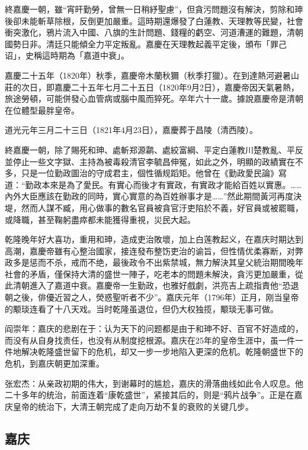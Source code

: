 終嘉慶一朝，雖“宵旰勤勞，曾無一日稍紓聖慮”，但貪污問題沒有解決，剪除和珅後卻未能斬草除根，反倒更加嚴重。這時期還爆發了白蓮教、天理教等民變，社會衝突激化，鴉片流入中國、八旗的生計問題、錢糧的虧空、河道漕運的難題，清朝國勢日非。清廷只能傾全力平定叛亂。嘉慶在天理教起義平定後，頒布「罪己诏」，史稱這時期為「嘉道中衰」。

嘉慶二十五年（1820年）秋季，嘉慶帝木蘭秋獮（秋季打獵）。在到達熱河避暑山莊的次日，即嘉慶二十五年七月二十五日（1820年9月2日），嘉慶帝因天氣暑熱，旅途勞頓，可能併發心血管病或腦中風而猝死。卒年六十一歲。據說嘉慶帝是清朝在位體型最胖皇帝。

道光元年三月二十三日（1821年4月23日），嘉慶葬于昌陵（清西陵）。

終嘉慶一朝，除了賜死和珅、處斬郑源鹴、處絞富綱、平定白蓮教川楚教亂、平反並停止一些文字獄、主持為被毒殺清官李毓昌伸冤，如此之外，明顯的政績實在不多，只是一位勤政圖治的守成君主，個性循规蹈矩。他曾在《勤政愛民論》寫道：“勤政本來是為了愛民。有實心而後才有實政，有實政才能給百姓以實惠。……內外大臣應該在勤政的同時，實心實意的為百姓辦事才是……”然此期間黃河再度決堤，然而人謀不臧，用心做事的數名官員被貪官汙吏陷於不義，好官員或被罷職，或降職，甚至鞠躬盡瘁都未能獲得重視，災民大起。

乾隆晚年好大喜功，重用和珅，造成吏治敗壞，加上白莲教起义，在嘉庆时期达到高潮，嘉慶帝雖有心整治國家，接连發布整饬吏治的谕旨，但性情优柔寡断，对弊政多是惩而不杀，戒而不绝，最後政令不出紫禁城，無力解決其皇父統治期間晚年社會的矛盾，僅保持大清的盛世一陣子，吃老本的問題未解決，貪污更加嚴重，從此清朝進入了嘉道中衰。嘉慶帝一生勤政，也雅好戲劇，洪亮吉上疏指責他“恐退朝之後，俳優近習之人，熒惑聖听者不少”。嘉庆元年（1796年）正月，刚当皇帝的颙琰连看了十八天戏。当时乾隆虽退位，但仍大权独揽，颙琰无事可做。

阎崇年：嘉庆的悲剧在于：认为天下的问题都是由于和珅不好、百官不好造成的，而没有从自身找责任，也没有从制度挖根源。嘉庆在25年的皇帝生涯中，虽一件一件地解决乾隆盛世留下的危机，却又一步一步地陷入更深的危机。乾隆朝盛世下的危机，到嘉庆朝更加深重。

张宏杰：从亲政初期的伟大，到谢幕时的尴尬，嘉庆的滑落曲线如此令人叹息。他二十多年的统治，前面连着“康乾盛世”，紧接其后的，则是“鸦片战争”。正是在嘉庆皇帝的统治下，大清王朝完成了走向万劫不复的衰败的关键几步。

\subsection{嘉庆}

